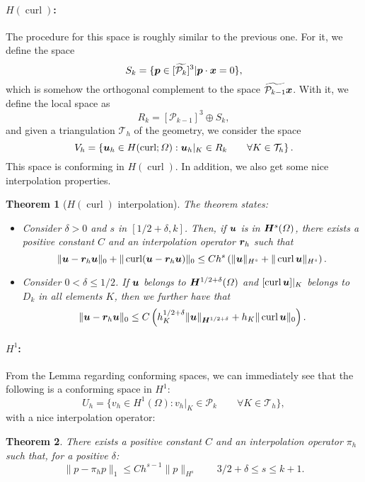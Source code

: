 \documentclass{article}
\renewcommand{\vec}{\vectorsym}
\DeclareMathOperator{\curl}{\text{curl}}
\newcommand{\T}{\mathcal{T}}
\renewcommand{\P}{\mathcal{P}}
\newtheorem{theorem}{Theorem}
\begin{document}
\paragraph{$H(\curl)$:} The procedure for this space is roughly similar to the previous one. For it, we define the space
    $$ S_k = \{ \vec p \in [\widetilde{\P_k}]^3 | \vec p \cdot \vec x = 0 \}, $$
which is somehow the orthogonal complement to the space $\widetilde{\P_{k-1}}\vec x$. With it, we define the local space as 
    $$ R_k = [\P_{k-1}]^3\oplus S_k, $$
and given a triangulation $\T_h$ of the geometry, we consider the space
    $$ V_h = \left\{ \vec u_h \in H(\curl;\Omega): \vec u_h|_K \in R_k\qquad \forall K\in \T_h\right\}. $$
This space is conforming in $H(\curl)$. In addition, we also get some nice interpolation properties. 
    \begin{theorem}[$H(\curl)$ interpolation] The theorem states: 
        \begin{itemize}
            \item Consider $\delta>0$ and $s$ in $[1/2+\delta, k]$. Then, if $\vec u$ is in $\vec H^s(\Omega)$, there exists a positive constant $C$ and an interpolation operator $\vec r_h$ such that 
                $$ \| \vec u - \vec r_h \vec u\|_0 + \| \curl(\vec u - \vec r_h \vec u) \|_0 \leq C h^s \left(\| \vec u\|_{H^s} + \| \curl \vec u \|_{H^s}\right) . $$
            \item Consider $0<\delta\leq 1/2$. If $\vec u$ belongs to $\vec H^{1/2+\delta}(\Omega)$ and $[\curl \vec u]|_K$ belongs to $D_k$ in all elements $K$, then we further have that
                $$ \|\vec u - \vec r_h \vec u\|_0 \leq C\left(h_K^{1/2+\delta} \| \vec u\|_{\vec H^{1/2+\delta}} + h_K \| \curl \vec u\|_0 \right). $$
        \end{itemize}
    \end{theorem}
\paragraph{$H^1$:} From the Lemma regarding conforming spaces, we can immediately see that the following is a conforming space in $H^1$: 
    $$ U_h = \{ v_h \in H^1(\Omega): v_h|_K \in \P_k \qquad\forall K\in \T_h\}, $$
with a nice interpolation operator:
    \begin{theorem}
        There exists a positive constant $C$ and an interpolation operator $\pi_h$ such that, for a positive $\delta$: 
         $$\|p - \pi_h p \|_1 \leq C h^{s-1} \|p\|_{H^s} \qquad 3/2+\delta \leq s \leq k+1 . $$
    \end{theorem}
\end{document}
